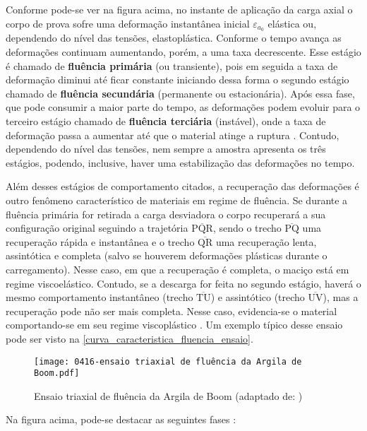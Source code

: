 Conforme pode-se ver na figura acima, no instante de aplicação da carga axial o corpo de prova sofre uma deformação instantânea inicial $\varepsilon_{a_{0}}$ elástica ou, dependendo do nível das tensões, elastoplástica. Conforme o tempo avança as deformações continuam aumentando, porém, a uma taxa decrescente. Esse estágio é chamado de \textbf{fluência primária} (ou transiente), pois em seguida a taxa de deformação diminui até ficar constante iniciando dessa forma o segundo estágio chamado de \textbf{fluência secundária} (permanente ou estacionária). Após essa fase, que pode consumir a maior parte do tempo, as deformações podem evoluir para o terceiro estágio chamado de \textbf{fluência terciária} (instável), onde a taxa de deformação passa a aumentar até que o material atinge a ruptura \cite{Costa1984}. Contudo, dependendo do nível das tensões, nem sempre a amostra apresenta os três estágios, podendo, inclusive, haver uma estabilização das deformações no tempo.

Além desses estágios de comportamento citados, a recuperação das deformações é outro fenômeno característico de materiais em regime de fluência. Se durante a fluência primária for retirada a carga desviadora o corpo recuperará a sua configuração original seguindo a trajetória $\overline{\textrm{PQR}}$, sendo o trecho $\overline{\textrm{PQ}}$ uma recuperação rápida e instantânea e o trecho $\overline{\textrm{QR}}$ uma recuperação lenta, assintótica e completa (salvo se houverem deformações plásticas durante o carregamento). Nesse caso, em que a recuperação é completa, o maciço está em regime viscoelástico. Contudo, se a descarga for feita no segundo estágio, haverá o mesmo comportamento instantâneo (trecho $\overline{\textrm{TU}}$) e assintótico (trecho $\overline{\textrm{UV}}$), mas a recuperação pode não ser mais completa. Nesse caso, evidencia-se o material comportando-se em seu regime viscoplástico \cite{Costa1984}. Um exemplo típico desse ensaio pode ser visto na \autoref{curva_caracteristica_fluencia_ensaio}.

\begin{figure}[H]
	\begin{center}
		\texttt{[image: 0416-ensaio triaxial de fluência da Argila de Boom.pdf]}
	\end{center}
	\caption{\label{curva_caracteristica_fluencia_ensaio}Ensaio triaxial de fluência da Argila de Boom (adaptado de: )}
\end{figure}

Na figura acima, pode-se destacar as seguintes fases \cite[p. 42]{Rousset1988}:

